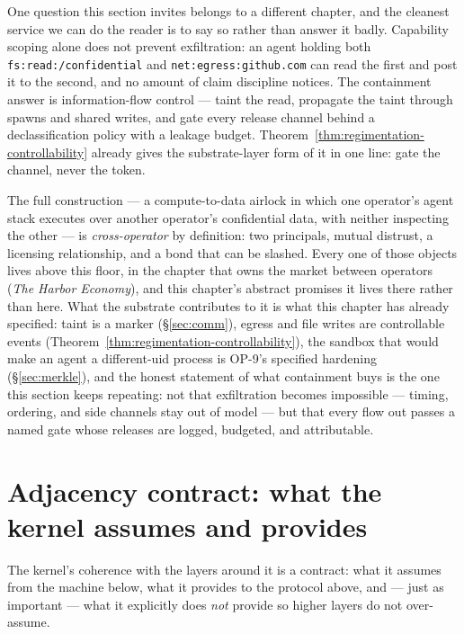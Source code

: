 \documentclass[11pt,a4paper]{article}
\theoremstyle{definition}
\theoremstyle{remark}
\begin{document}
One question this section invites belongs to a different chapter, and the cleanest
service we can do the reader is to say so rather than answer it badly. Capability
scoping alone does not prevent exfiltration: an agent holding both
\texttt{fs:read:/confidential} and \texttt{net:egress:github.com} can read the first
and post it to the second, and no amount of claim discipline notices. The
containment answer is information-flow control --- taint the read, propagate the
taint through spawns and shared writes, and gate every release channel behind a
declassification policy with a leakage budget. Theorem~\ref{thm:regimentation-controllability}
already gives the substrate-layer form of it in one line: gate the channel, never
the token.

The full construction --- a compute-to-data airlock in which one operator's agent
stack executes over another operator's confidential data, with neither inspecting
the other --- is \emph{cross-operator} by definition: two principals, mutual
distrust, a licensing relationship, and a bond that can be slashed. Every one of
those objects lives above this floor, in the chapter that owns the market between
operators (\emph{The Harbor Economy}), and this chapter's abstract promises it lives
there rather than here. What the substrate contributes to it is what this chapter
has already specified: taint is a marker (\S\ref{sec:comm}), egress and file writes
are controllable events (Theorem~\ref{thm:regimentation-controllability}), the sandbox that
would make an agent a different-uid process is OP-9's specified hardening
(\S\ref{sec:merkle}), and the honest statement of what containment buys is the one
this section keeps repeating: not that exfiltration becomes impossible --- timing,
ordering, and side channels stay out of model --- but that every flow out passes a
named gate whose releases are logged, budgeted, and attributable.

\pdexercisepointer{\ref{ex:swk-hash-chain-adversary}}{\ref{ex:swk-op9-hardening}}{\pageref{ex:swk-hash-chain-adversary}}

\section{Adjacency contract: what the kernel assumes and provides}
\label{sec:adjacency}

The kernel's coherence with the layers around it is a contract: what it assumes
from the machine below, what it provides to the protocol above, and --- just as
important --- what it explicitly does \emph{not} provide so higher layers do not
over-assume.
\end{document}

